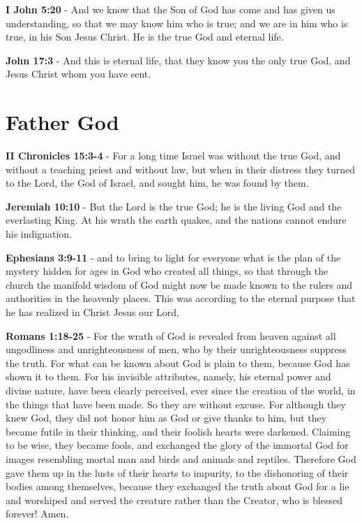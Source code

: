 \documentclass[11pt]{article}
\begin{document}
\textbf{I John 5:20} - And we know that the Son of God has come and has given us understanding, so that we may know him who is true; and we are in him who is true, in his Son Jesus Christ. He is the true God and eternal life.

\textbf{John 17:3} - And this is eternal life, that they know you the only true God, and Jesus Christ whom you have sent.

\section{Father God}
\label{sec:org35c5b69}
\textbf{II Chronicles 15:3-4} - For a long time Israel was without the true God, and without a teaching priest and without law, but when in their distress they turned to the Lord, the God of Israel, and sought him, he was found by them.

\textbf{Jeremiah 10:10} - But the Lord is the true God; he is the living God and the everlasting King. At his wrath the earth quakes, and the nations cannot endure his indignation.

\textbf{Ephesians 3:9-11} - and to bring to light for everyone what is the plan of the mystery hidden for ages in God who created all things, so that through the church the manifold wisdom of God might now be made known to the rulers and authorities in the heavenly places. This was according to the eternal purpose that he has realized in Christ Jesus our Lord,

\textbf{Romans 1:18-25} - For the wrath of God is revealed from heaven against all ungodliness and unrighteousness of men, who by their unrighteousness suppress the truth. For what can be known about God is plain to them, because God has shown it to them. For his invisible attributes, namely, his eternal power and divine nature, have been clearly perceived, ever since the creation of the world, in the things that have been made. So they are without excuse. For although they knew God, they did not honor him as God or give thanks to him, but they became futile in their thinking, and their foolish hearts were darkened. Claiming to be wise, they became fools, and exchanged the glory of the immortal God for images resembling mortal man and birds and animals and reptiles. Therefore God gave them up in the lusts of their hearts to impurity, to the dishonoring of their bodies among themselves, because they exchanged the truth about God for a lie and worshiped and served the creature rather than the Creator, who is blessed forever! Amen.
\end{document}
